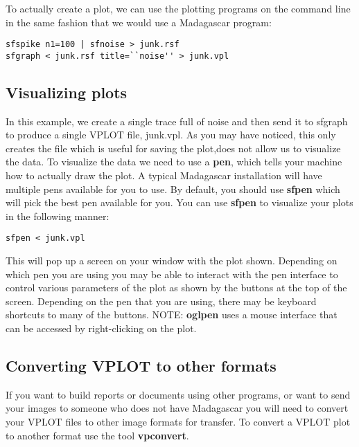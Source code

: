 To actually create a plot, we can use the plotting programs on the command line in the same fashion that we would use a Madagascar program:
\begin{verbatim}
sfspike n1=100 | sfnoise > junk.rsf
sfgraph < junk.rsf title=``noise'' > junk.vpl
\end{verbatim}
\subsection{Visualizing plots}

    In this example, we create a single trace full of noise and then send it to sfgraph to produce a single VPLOT file, junk.vpl.  As you may have noticed, this only creates the file which is useful for saving the plot,does not allow us to  visualize the data.  To visualize the data we need to use a \textbf{pen}, which tells your machine how to actually draw the plot.   A typical Madagascar installation will have multiple pens available for you to use.  By default, you should use \textbf{sfpen} which will pick the best pen available for you.  You can use \textbf{sfpen} to visualize your plots in the following manner:
\begin{verbatim}
sfpen < junk.vpl
\end{verbatim}
This will pop up a screen on your window with the plot shown.  Depending on which pen you are using you may be able to interact with the pen interface to control various parameters of the plot as shown by the buttons at the top of the screen.  Depending on the pen that you are using, there may be keyboard shortcuts to many of the buttons.  NOTE: \textbf{oglpen} uses a mouse interface that can be accessed by right-clicking on the plot.

\subsection{Converting VPLOT to other formats}

If you want to build reports or documents using other programs, or want to send your images to someone who does not have Madagascar you will need to convert your VPLOT files to other image formats for transfer.    To convert a VPLOT plot to another format use the tool \textbf{vpconvert}.  

